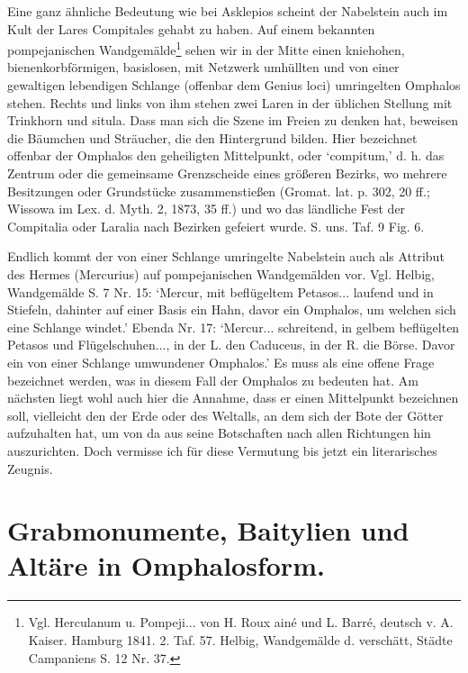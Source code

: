 \documentclass[a4paper, 11pt, oneside]{article}
\begin{document}
Eine ganz ähnliche Bedeutung wie bei Asklepios scheint der Nabelstein auch im Kult der Lares Compitales gehabt zu haben. Auf einem bekannten pompejanischen Wandgemälde\footnote{Vgl. Herculanum u. Pompeji... von H. Roux ainé und L. Barré, deutsch v. A. Kaiser. Hamburg 1841. 2. Taf. 57. Helbig, Wandgemälde d. verschätt, Städte Campaniens S. 12 Nr. 37.} sehen wir in der Mitte einen kniehohen, bienenkorbförmigen, basislosen, mit Netzwerk umhüllten und von einer gewaltigen lebendigen Schlange (offenbar dem Genius loci) umringelten Omphalos stehen. Rechts und links von ihm stehen zwei Laren in der üblichen Stellung mit Trinkhorn und situla. Dass man sich die Szene im Freien zu denken hat, beweisen die Bäumchen und Sträucher, die den Hintergrund bilden. Hier bezeichnet offenbar der Omphalos den geheiligten Mittelpunkt, oder `compitum,' d. h. das Zentrum oder die gemeinsame Grenzscheide eines größeren Bezirks, wo mehrere Besitzungen oder Grundstücke zusammenstießen (Gromat. lat. p. 302, 20 ff.; Wissowa im Lex. d. Myth. 2, 1873, 35 ff.) und wo das ländliche Fest der Compitalia oder Laralia nach Bezirken gefeiert wurde. S. uns. Taf. 9 Fig. 6.

Endlich kommt der von einer Schlange umringelte Nabelstein auch als Attribut des Hermes (Mercurius) auf pompejanischen Wandgemälden vor. Vgl. Helbig, Wandgemälde S. 7 Nr. 15: `Mercur, mit beflügeltem Petasos... laufend und in Stiefeln, dahinter auf einer Basis ein Hahn, davor ein Omphalos, um welchen sich eine Schlange windet.' Ebenda Nr. 17: `Mercur... schreitend, in gelbem beflügelten Petasos und Flügelschuhen..., in der L. den Caduceus, in der R. die Börse. Davor ein von einer Schlange umwundener Omphalos.' Es muss als eine offene Frage bezeichnet werden, was in diesem Fall der Omphalos zu bedeuten hat. Am nächsten liegt wohl auch hier die Annahme, dass er einen Mittelpunkt bezeichnen soll, vielleicht den der Erde oder des Weltalls, an dem sich der Bote der Götter aufzuhalten hat, um von da aus seine Botschaften nach allen Richtungen hin auszurichten. Doch vermisse ich für diese Vermutung bis jetzt ein literarisches Zeugnis.
\clearpage
\section{Grabmonumente, Baitylien und Altäre in Omphalosform.}
\end{document}
